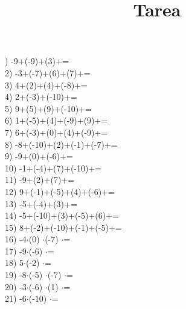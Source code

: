 \documentclass[a4paper,10pt]{article}
\title{Tarea}
\author{}
\date{}
\begin{document}
)   -9+(-9)+(3)+=
\vspace{0.5cm}\\2)   -3+(-7)+(6)+(7)+=
\vspace{0.5cm}\\3)   4+(2)+(4)+(-8)+=
\vspace{0.5cm}\\4)   2+(-3)+(-10)+=
\vspace{0.5cm}\\5)   9+(5)+(9)+(-10)+=
\vspace{0.5cm}\\6)   1+(-5)+(4)+(-9)+(9)+=
\vspace{0.5cm}\\7)   6+(-3)+(0)+(4)+(-9)+=
\vspace{0.5cm}\\8)   -8+(-10)+(2)+(-1)+(-7)+=
\vspace{0.5cm}\\9)   -9+(0)+(-6)+=
\vspace{0.5cm}\\10)   -1+(-4)+(7)+(-10)+=
\vspace{0.5cm}\\11)   -9+(2)+(7)+=
\vspace{0.5cm}\\12)   9+(-1)+(-5)+(4)+(-6)+=
\vspace{0.5cm}\\13)   -5+(-4)+(3)+=
\vspace{0.5cm}\\14)   -5+(-10)+(3)+(-5)+(6)+=
\vspace{0.5cm}\\15)   8+(-2)+(-10)+(-1)+(-5)+=
\vspace{0.5cm}\\16)   -4$\cdot$(0) $\cdot$(-7) $\cdot$=
\vspace{0.5cm}\\17)   -9$\cdot$(-6) $\cdot$=
\vspace{0.5cm}\\18)   5$\cdot$(-2) $\cdot$=
\vspace{0.5cm}\\19)   -8$\cdot$(-5) $\cdot$(-7) $\cdot$=
\vspace{0.5cm}\\20)   -3$\cdot$(-6) $\cdot$(1) $\cdot$=
\vspace{0.5cm}\\21)   -6$\cdot$(-10) $\cdot$=
\end{document}
